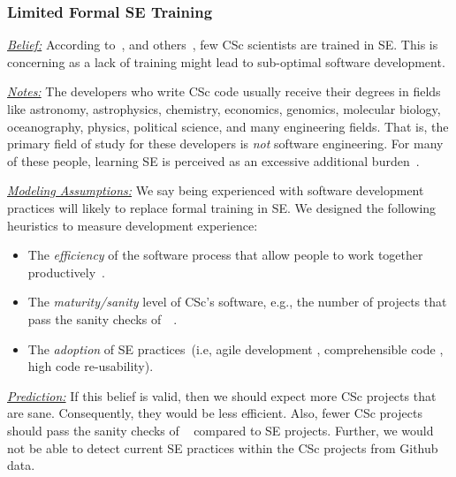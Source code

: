 \documentclass[conference,10pt]{IEEEtran}
\newcommand{\bi}{\begin{itemize}}
\newcommand{\ei}{\end{itemize}}
\begin{document}



\subsubsection{Limited Formal SE Training}\label{tion:training} 

\noindent \textit{\underline{Belief:}} According to~\citet{segal_enduser},
and others~\cite{basili08_hpc, carver13_perception, sanders08_risk}, few CSc scientists are trained in SE.\hspace{-2pt} This is concerning as a lack of training might lead to sub-optimal software
development.

\noindent \textit{\underline{Notes:}} 
The developers who write CSc code usually
receive their degrees in fields like
astronomy, astrophysics, chemistry, economics, genomics, molecular biology, oceanography, physics, political science, and many engineering fields.
That is, the primary field of study for these developers is {\em not}
software engineering. For many of these people,
learning SE is perceived as an excessive additional burden~\cite{boyle09_lessons}.

\noindent \textit{\underline{Modeling Assumptions:}} 
We say being experienced with software development practices will likely to replace formal training in SE. We designed the following heuristics to measure development experience:
\bi
\item The {\em efficiency} of the software process that allow  people to work together productively~\cite{Portela_17}. 
\item The {\em maturity/sanity} level of CSc's software, e.g., the number of projects that pass the sanity checks of~~\cite{Kalliamvakou:2014}.
\item The {\em adoption} of SE practices~(i.e,\hspace{-2pt} agile development \cite{levy2009knowledge},\hspace{-2pt} comprehensible code \cite{von1995program},  high code re-usability\cite{code_reuse}).
\ei

\noindent \textit{\underline{Prediction:}} If this belief is valid, then we should expect more CSc projects that are sane. Consequently, they would be less efficient. Also, fewer CSc projects should pass the sanity checks of ~ compared to SE projects. Further, we would not be able to detect current SE practices within the CSc projects from Github data.
\end{document}
